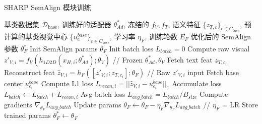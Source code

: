 \begin{algorithm}[htbp] 
\caption{SHARP SemAlign 模块训练} 
\label{alg:semalign_training} 
\begin{algorithmic}[1]
\REQUIRE 基类数据集 $\mathcal{D}_{\text{base}}$, 训练好的适配器 $\theta_{Ad}^*$, 冻结的 $f_V, f_T$, 语义特征 $\{z_{T,c}\}_{c \in C_{base}}$, 预计算的基类视觉中心 $\{u_c^{base}\}_{c \in C_{base}}$, 学习率 $\eta_F$, 训练轮数 $E_F$ \ENSURE 优化后的 SemAlign 参数 $\theta_F^*$ 
\STATE Init SemAlign params $\theta_F$
        \STATE Init batch loss $L_{batch} = 0$
            \STATE Compute raw visual $z'_{V,i} = f_V(h_{1D2D}(x_{H,i}; \theta_{Ad}^*); \theta_V)$ // Frozen $\theta_{Ad}^*, \theta_V$
            \STATE Fetch text feat $z_{T,c_i}$
            \STATE Reconstruct feat $\hat{z}_{V,i} = h_F([z'_{V,i}; z_{T,c_i}]; \theta_F)$ // Raw $z'_{V,i}$ input
            \STATE Fetch base center $u_{c_i}^{base}$
            \STATE Compute L1 loss $L_{recon, i} = || \hat{z}_{V,i} - u_{c_i}^{base} ||_1$
            \STATE Accumulate loss $L_{batch} \leftarrow L_{batch} + L_{recon, i}$
        \ENDFOR
        \STATE Avg batch loss $L_{avg\_batch} = L_{batch} / B_{size}$
        \STATE Compute gradients $\nabla_{\theta_F} L_{avg\_batch}$
        \STATE Update params $\theta_F \leftarrow \theta_F - \eta_F \nabla_{\theta_F} L_{avg\_batch}$ // $\eta_F$ = LR
    \ENDFOR
\ENDFOR
\STATE Store trained params $\theta_F^* \leftarrow \theta_F$
\end{algorithmic} 
\end{algorithm} 

